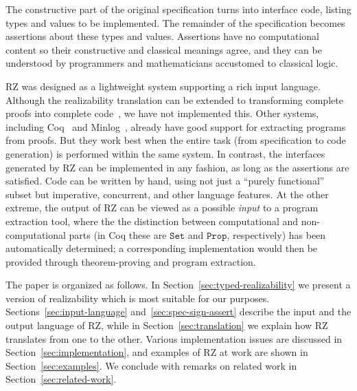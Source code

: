 The constructive part of the original specification turns into
interface code,
listing types and values to be implemented. The remainder of
the specification becomes assertions about these types and values.
Assertions have no computational content so their constructive
and classical meanings agree, and they can
be understood by programmers and mathematicians accustomed to
classical logic.


RZ was designed as a lightweight system
supporting a rich input language. Although the
realizability translation can be extended to transforming complete
proofs into complete code~\cite{komagata+:tr95}, we have not
implemented this. Other systems, including Coq~\cite{coqart} and
Minlog~\cite{benl98:_proof_theor_work}, already have good support for
extracting programs from proofs. But they work best when the entire
task (from specification to code generation) is performed within the
same system. In contrast, the interfaces generated by RZ can be
implemented in any fashion, as long as the assertions are satisfied.
Code can be written by hand, using not just a ``purely functional'' subset
but imperative, concurrent, and other language features. At the other
extreme, the output of RZ can be viewed as a possible \emph{input} to
a program extraction tool, where the the distinction between
computational and non-computational parts (in Coq these are
$\mathtt{Set}$ and $\mathtt{Prop}$, respectively) has been
automatically determined; a corresponding implementation would then be
provided through theorem-proving and program extraction.


The paper is organized as follows. In
Section~\ref{sec:typed-realizability} we present a version of
realizability which is most suitable for our purposes.
Sections~\ref{sec:input-language} and~\ref{sec:spec-sign-assert}
describe the input and the output language of RZ, while in
Section~\ref{sec:translation} we explain how RZ translates from one to
the other. Various implementation issues are discussed in
Section~\ref{sec:implementation}, and examples of RZ at work are shown
in Section~\ref{sec:examples}. We conclude with remarks on related
work in Section~\ref{sec:related-work}.


